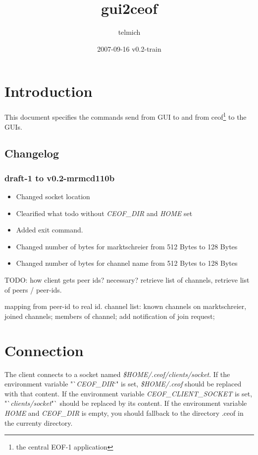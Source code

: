 \documentclass[12pt,a4paper]{article}
\begin{document}
\title{gui2ceof}
\date{2007-09-16 v0.2-train}
\author{telmich}

\maketitle
\tableofcontents

\section{Introduction}
This document specifies the commands send from GUI to and from
ceof\footnote{the central EOF-1 application} to the GUIs.

\subsection{Changelog}
\subsubsection{draft-1 to v0.2-mrmcd110b}
\begin{itemize}
\item Changed socket location
\item Clearified what todo without \textit{CEOF\_DIR} and \textit{HOME} set
\item Added exit command.
\item Changed number of bytes for marktschreier from 512 Bytes to 128 Bytes
\item Changed number of bytes for channel name from 512 Bytes to 128 Bytes
\end{itemize}

TODO: how client gets peer ids? necessary?
retrieve list of channels,
retrieve list of peers / peer-ids.

mapping from peer-id to real id.
channel list: known channels on marktschreier,
joined channels;
members of channel;
add notification of join request;

\section{Connection}
The client connects to a socket named \textit{\$HOME/.ceof/clients/socket}.
If the environment variable "`\textit{CEOF\_DIR}`" is set,
\textit{\$HOME/.ceof} should be replaced with that content.
If the environment variable \textit{CEOF\_CLIENT\_SOCKET} is set,
"`\textit{clients/socket}"` should be replaced by its content.
If the environment variable \textit{HOME} and \textit{CEOF\_DIR}
is empty, you should fallback to the directory .ceof in the currenty directory.
\end{document}
